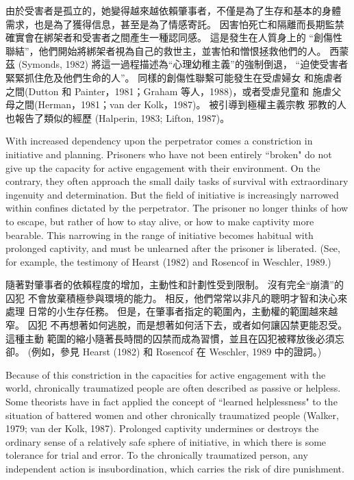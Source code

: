 \documentclass[12pt]{article}
\begin{document}
    由於受害者是孤立的，她變得越來越依賴肇事者，不僅是為了生存和基本的身體
    需求，也是為了獲得信息，甚至是為了情感寄託。 因害怕死亡和隔離而長期監禁
    確實會在綁架者和受害者之間產生一種認同感。 這是發生在人質身上的
    “創傷性聯結”，他們開始將綁架者視為自己的救世主，並害怕和憎恨拯救他們的人。
    西蒙茲 (Symonds, 1982) 將這一過程描述為“心理幼稚主義”的強制倒退，
    “迫使受害者緊緊抓住危及他們生命的人”。 同樣的創傷性聯繫可能發生在受虐婦女
    和施虐者之間(Dutton 和 Painter，1981；Graham 等人，1988)，或者受虐兒童和
    施虐父母之間(Herman，1981；van der Kolk，1987)。 被引導到極權主義宗教
    邪教的人也報告了類似的經歷 (Halperin, 1983; Lifton, 1987)。

    With increased dependency upon the perpetrator comes a constriction in
    initiative and planning. Prisoners who have not been entirely ``broken" do
    not give up the capacity for active engagement with their environment. On
    the contrary, they often approach the small daily tasks of survival with
    extraordinary ingenuity and determination. But the field of initiative is
    increasingly narrowed within confines dictated by the perpetrator. The
    prisoner no longer thinks of how to escape, but rather of how to stay
    alive, or how to make captivity more bearable. This narrowing in the range
    of initiative becomes habitual with prolonged captivity, and must be
    unlearned after the prisoner is liberated. (See, for example, the testimony
    of Hearst (1982) and Rosencof in Weschler, 1989.)

    隨著對肇事者的依賴程度的增加，主動性和計劃性受到限制。 沒有完全“崩潰”的囚犯
    不會放棄積極參與環境的能力。 相反，他們常常以非凡的聰明才智和決心來處理
    日常的小生存任務。 但是，在肇事者指定的範圍內，主動權的範圍越來越窄。 囚犯
    不再想著如何逃脫，而是想著如何活下去，或者如何讓囚禁更能忍受。 這種主動
    範圍的縮小隨著長時間的囚禁而成為習慣，並且在囚犯被釋放後必須忘卻。
    (例如，參見 Hearst (1982) 和 Rosencof 在 Weschler, 1989 中的證詞。)

    Because of this constriction in the capacities for active engagement with
    the world, chronically traumatized people are often described as passive or
    helpless. Some theorists have in fact applied the concept of ``learned
    helplessness" to the situation of battered women and other chronically
    traumatized people (Walker, 1979; van der Kolk, 1987). Prolonged captivity
    undermines or destroys the ordinary sense of a relatively safe sphere of
    initiative, in which there is some tolerance for trial and error. To the
    chronically traumatized person, any independent action is insubordination,
    which carries the risk of dire punishment.
\end{document}
